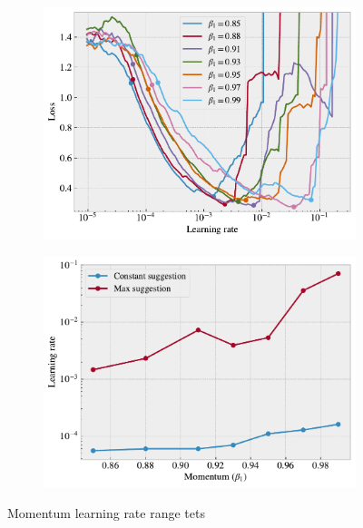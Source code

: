 \begin{figure}[H]
  \centering
  \begin{subfigure}[t]{0.49\textwidth}
      \centering
      \includegraphics[width=\textwidth]{figures/ML/LR_momentum_test_a.pdf}
      \caption{}
  \end{subfigure}
  \hfill
  \begin{subfigure}[t]{0.49\textwidth}
      \centering
      \includegraphics[width=\textwidth]{figures/ML/LR_momentum_test_b.pdf}
      \caption{}
  \end{subfigure}
  \hfill
  \caption{Momentum learning rate range tets}
  \label{fig:LR_range_mom}
\end{figure}


